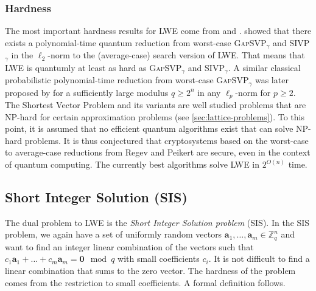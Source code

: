 \subsubsection{Hardness} \label{sec:lwe-hardness}
The most important hardness results for LWE come from \cite{Reg05} and \cite{Pei09}. \citet{Reg05} showed that there exists a polynomial-time quantum reduction from worst-case \textsc{GapSVP}$_\gamma$ and SIVP$_\gamma$ in the $\ell_2$-norm to the (average-case) search version of LWE. That means that LWE is quantumly at least as hard as \textsc{GapSVP}$_\gamma$ and SIVP$_\gamma$. A similar classical probabilistic polynomial-time reduction from worst-case \textsc{GapSVP}$_\gamma$ was later proposed by \citet{Pei09} for a sufficiently large modulus $q\geq 2^n$ in any $\ell_p$-norm for $p \geq 2$. The Shortest Vector Problem and its variants are well studied problems that are NP-hard for certain approximation problems (see \cref{sec:lattice-problems}). To this point, it is assumed that no efficient quantum algorithms exist that can solve NP-hard problems. It is thus conjectured that cryptosystems based on the worst-case to average-case reductions from Regev and Peikert are secure, even in the context of quantum computing. The currently best algorithms solve LWE in $2^{O(n)}$ time.




\subsection{Short Integer Solution (SIS)}
The dual problem to LWE is the \textit{Short Integer Solution problem} (SIS).
In the SIS problem, we again have a set of uniformly random vectors $\mathbf{a}_1, \ldots, \mathbf{a}_m \in \mathbb{Z}_q^n$ and want to find an integer linear combination of the vectors such that $c_1 \mathbf{a}_1 + \dots  + c_m \mathbf{a}_m = \mathbf{0} \mod q$ with small coefficients $c_i$. It is not difficult to find a linear combination that sums to the zero vector. The hardness of the problem comes from the restriction to small coefficients. A formal definition follows. %


